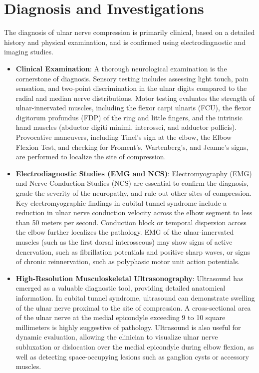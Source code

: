 \section*{Diagnosis and Investigations}
The diagnosis of ulnar nerve compression is primarily clinical, based on a detailed history and physical examination, and is confirmed using electrodiagnostic and imaging studies.

\begin{itemize}
  \item \textbf{Clinical Examination}: A thorough neurological examination is the cornerstone of diagnosis. Sensory testing includes assessing light touch, pain sensation, and two-point discrimination in the ulnar digits compared to the radial and median nerve distributions. Motor testing evaluates the strength of ulnar-innervated muscles, including the flexor carpi ulnaris (FCU), the flexor digitorum profundus (FDP) of the ring and little fingers, and the intrinsic hand muscles (abductor digiti minimi, interossei, and adductor pollicis). Provocative maneuvers, including Tinel's sign at the elbow, the Elbow Flexion Test, and checking for Froment's, Wartenberg's, and Jeanne's signs, are performed to localize the site of compression.
  \item \textbf{Electrodiagnostic Studies (EMG and NCS)}: Electromyography (EMG) and Nerve Conduction Studies (NCS) are essential to confirm the diagnosis, grade the severity of the neuropathy, and rule out other sites of compression. Key electromyographic findings in cubital tunnel syndrome include a reduction in ulnar nerve conduction velocity across the elbow segment to less than 50 meters per second. Conduction block or temporal dispersion across the elbow further localizes the pathology. EMG of the ulnar-innervated muscles (such as the first dorsal interosseous) may show signs of active denervation, such as fibrillation potentials and positive sharp waves, or signs of chronic reinnervation, such as polyphasic motor unit action potentials.
  \item \textbf{High-Resolution Musculoskeletal Ultrasonography}: Ultrasound has emerged as a valuable diagnostic tool, providing detailed anatomical information. In cubital tunnel syndrome, ultrasound can demonstrate swelling of the ulnar nerve proximal to the site of compression. A cross-sectional area of the ulnar nerve at the medial epicondyle exceeding 9 to 10 square millimeters is highly suggestive of pathology. Ultrasound is also useful for dynamic evaluation, allowing the clinician to visualize ulnar nerve subluxation or dislocation over the medial epicondyle during elbow flexion, as well as detecting space-occupying lesions such as ganglion cysts or accessory muscles.

\end{itemize}

